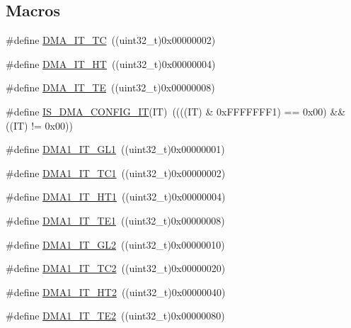 \subsection*{Macros}
\begin{DoxyCompactItemize}
\item 
\#define \hyperlink{group___d_m_a__interrupts__definition_ga06e83dd277e0d3e5635cf8ce8dfd6e16}{D\+M\+A\+\_\+\+I\+T\+\_\+\+TC}~((uint32\+\_\+t)0x00000002)
\item 
\#define \hyperlink{group___d_m_a__interrupts__definition_gadf11c572b9797e04a14b105fdc2e5f66}{D\+M\+A\+\_\+\+I\+T\+\_\+\+HT}~((uint32\+\_\+t)0x00000004)
\item 
\#define \hyperlink{group___d_m_a__interrupts__definition_gaf9d92649d2a0146f663ff253d8f3b59e}{D\+M\+A\+\_\+\+I\+T\+\_\+\+TE}~((uint32\+\_\+t)0x00000008)
\item 
\#define \hyperlink{group___d_m_a__interrupts__definition_ga47f6af7da302c19aba24516037d305e7}{I\+S\+\_\+\+D\+M\+A\+\_\+\+C\+O\+N\+F\+I\+G\+\_\+\+IT}(IT)~((((IT) \& 0x\+F\+F\+F\+F\+F\+F\+F1) == 0x00) \&\& ((\+I\+T) != 0x00))
\item 
\#define \hyperlink{group___d_m_a__interrupts__definition_ga017d35f4f6fbf5689ef39af7227bc5b0}{D\+M\+A1\+\_\+\+I\+T\+\_\+\+G\+L1}~((uint32\+\_\+t)0x00000001)
\item 
\#define \hyperlink{group___d_m_a__interrupts__definition_ga783532083dcc6e9752feb2e982ce7426}{D\+M\+A1\+\_\+\+I\+T\+\_\+\+T\+C1}~((uint32\+\_\+t)0x00000002)
\item 
\#define \hyperlink{group___d_m_a__interrupts__definition_gaea8c98e79c8cb420c81f7380a4c8e1da}{D\+M\+A1\+\_\+\+I\+T\+\_\+\+H\+T1}~((uint32\+\_\+t)0x00000004)
\item 
\#define \hyperlink{group___d_m_a__interrupts__definition_ga0121b479efafe485719d14634a02d542}{D\+M\+A1\+\_\+\+I\+T\+\_\+\+T\+E1}~((uint32\+\_\+t)0x00000008)
\item 
\#define \hyperlink{group___d_m_a__interrupts__definition_ga183f3044b39da5e3b3c688239086f836}{D\+M\+A1\+\_\+\+I\+T\+\_\+\+G\+L2}~((uint32\+\_\+t)0x00000010)
\item 
\#define \hyperlink{group___d_m_a__interrupts__definition_ga14171253268d69143102594cde56b0e1}{D\+M\+A1\+\_\+\+I\+T\+\_\+\+T\+C2}~((uint32\+\_\+t)0x00000020)
\item 
\#define \hyperlink{group___d_m_a__interrupts__definition_gab2d608582c350ed00412f7a09fe10ae7}{D\+M\+A1\+\_\+\+I\+T\+\_\+\+H\+T2}~((uint32\+\_\+t)0x00000040)
\item 
\#define \hyperlink{group___d_m_a__interrupts__definition_ga24e2ed429ff0c0b03c7fec8f4bc8bcc8}{D\+M\+A1\+\_\+\+I\+T\+\_\+\+T\+E2}~((uint32\+\_\+t)0x00000080)

\end{DoxyCompactItemize}
